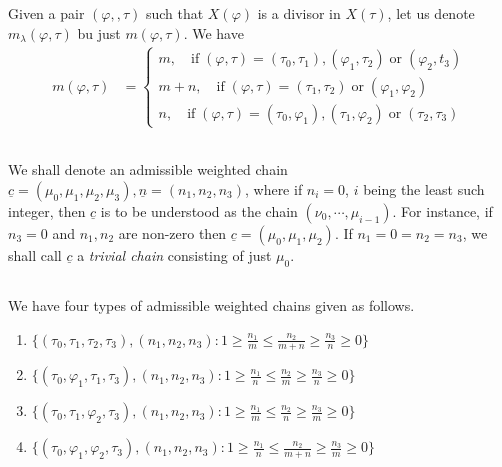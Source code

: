 Given a pair $(\varphi,,\tau)$ such that $X(\varphi)$ is a divisor in $X(\tau)$, let us denote $m_{\lambda}(\varphi, \tau)$ bu just $m(\varphi, \tau)$. We have
\begin{align*}
m(\varphi, \tau) &=
\begin{cases}
m, \quad \text{if}\; (\varphi, \tau) =(\tau_{0}, \tau_{1}), (\varphi_{1}, \tau_{2}) \;\text{or}\; (\varphi_{2}, t_{3})\\
m+n,\quad \text{if}\; (\varphi, \tau) =(\tau_{1}, \tau_{2})\; \text{or} \; (\varphi_{1}, \varphi_{2})\\
n, \quad \text{if} \; (\varphi, \tau) =(\tau_{0}, \varphi_{1}), (\tau_{1}, \varphi_{2})\; \text{or}\; (\tau_{2}, \tau_{3})
\end{cases}
\end{align*}

\subsection{}\label{art9-subsec-4.4}
We shall denote an admissible weighted chain $\underline{c} =(\mu_{0},\mu_{1}, \mu_{2}, \mu_{3}), \underline{n} = (n_{1}, n_{2}, n_{3})$, where if $n_{i} = 0$, $i$ being the least such integer, then $\underline{c}$ is to be understood as the chain $(\nu_{0}, \cdots,\mu_{i-1})$. For instance, if $n_{3}=0$ and $n_{1}, n_{2}$ are non-zero then $\underline{c} = (\mu_{0}, \mu_{1},\mu_{2})$. If $n_{1}=0 =n_{2} =n_{3}$, we shall call $\underline{c}$ a \textit{trivial chain} consisting of just $\mu_{0}$.  

\subsection{}\label{art9-subsec-4.5}
We have four types of admissible weighted chains given as follows.
\begin{enumerate}[Type I:]
\item $\{(\tau_{0}, \tau_{1}, \tau_{2}, \tau_{3}), (n_{1}, n_{2}, n_{3}) : 1 \geq \frac{n_{1}}{m} \leq \frac{n_{2}}{m+n}   \geq \frac{n_{3}}{n}\geq 0\}$\label{art9-subsec4.5-I}

\item $\{(\tau_{0}, \varphi_{1}, \tau_{1}, \tau_{3}), (n_{1}, n_{2}, n_{3}) : 1 \geq \frac{n_{1}}{n} \leq \frac{n_{2}}{m} \geq \frac{n_{3}}{n} \geq 0\}$\label{art9-subsec4.5-II}

\item $\{(\tau_{0}, \tau_{1}, \varphi_{2}, \tau_{3}), (n_{1}, n_{2}, n_{3}) : 1 \geq \frac{n_{1}}{m} \leq \frac{n_{2}}{n} \geq \frac{n_{3}}{m} \geq 0\}$\label{art9-subsec4.5-III}

\item $\{(\tau_{0}, \varphi_{1}, \varphi_{2}, \tau_{3}), (n_{1}, n_{2}, n_{3}) : 1 \geq \frac{n_{1}}{n} \leq \frac{n_{2}}{m+n} \geq \frac{n_{3}}{m} \geq 0\}$\label{art9-subsec4.5-IV}
\end{enumerate}

